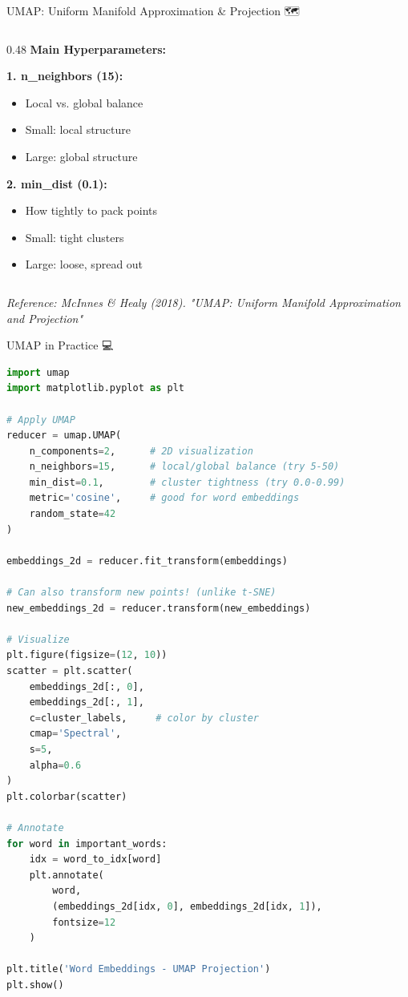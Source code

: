 \documentclass[aspectratio=169]{beamer}
\begin{document}
\begin{frame}[shrink=10]{UMAP: Uniform Manifold Approximation \& Projection 🗺️}
\begin{columns}[T]
\begin{column}{0.48\textwidth}
\vspace{0.5em}
\textbf{Main Hyperparameters:}

\vspace{0.3em}
\textbf{1. n\_neighbors (15):}
\begin{itemize}\setlength{\itemsep}{0pt}
    \item Local vs. global balance
    \item Small: local structure
    \item Large: global structure
\end{itemize}

\vspace{0.3em}
\textbf{2. min\_dist (0.1):}
\begin{itemize}\setlength{\itemsep}{0pt}
    \item How tightly to pack points
    \item Small: tight clusters
    \item Large: loose, spread out
\end{itemize}
\end{column}
\end{columns}

\vspace{0.5em}
\small
\textit{Reference: McInnes \& Healy (2018). "UMAP: Uniform Manifold Approximation and Projection"}
\end{frame}

\begin{frame}[fragile]{UMAP in Practice 💻}
\begin{lstlisting}[language=Python]
import umap
import matplotlib.pyplot as plt

# Apply UMAP
reducer = umap.UMAP(
    n_components=2,      # 2D visualization
    n_neighbors=15,      # local/global balance (try 5-50)
    min_dist=0.1,        # cluster tightness (try 0.0-0.99)
    metric='cosine',     # good for word embeddings
    random_state=42
)

embeddings_2d = reducer.fit_transform(embeddings)

# Can also transform new points! (unlike t-SNE)
new_embeddings_2d = reducer.transform(new_embeddings)

# Visualize
plt.figure(figsize=(12, 10))
scatter = plt.scatter(
    embeddings_2d[:, 0],
    embeddings_2d[:, 1],
    c=cluster_labels,     # color by cluster
    cmap='Spectral',
    s=5,
    alpha=0.6
)
plt.colorbar(scatter)

# Annotate
for word in important_words:
    idx = word_to_idx[word]
    plt.annotate(
        word,
        (embeddings_2d[idx, 0], embeddings_2d[idx, 1]),
        fontsize=12
    )

plt.title('Word Embeddings - UMAP Projection')
plt.show()
\end{lstlisting}
\end{frame}
\end{document}

